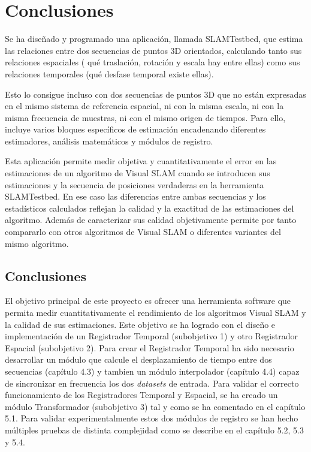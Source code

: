 \newpage

\chapter{Conclusiones} \label{cap:conclusiones}

Se ha diseñado y programado una aplicación, llamada SLAMTestbed, que estima las relaciones entre dos secuencias de puntos 3D orientados, calculando tanto sus relaciones espaciales ( qué traslación, rotación y escala hay entre ellas) como sus relaciones temporales (qué desfase temporal existe ellas).

Esto lo consigue incluso con dos secuencias de puntos 3D que no están expresadas en el mismo sistema de referencia espacial, ni con la misma escala, ni con la misma frecuencia de muestras, ni con el mismo origen de tiempos. Para ello, incluye varios bloques específicos de estimación encadenando diferentes estimadores, análisis matemáticos y módulos de registro.

Esta aplicación permite medir objetiva y cuantitativamente el error en las estimaciones de un algoritmo de Visual SLAM cuando se introducen sus estimaciones y la secuencia de posiciones verdaderas en la herramienta SLAMTestbed. En ese caso las diferencias entre ambas secuencias y los estadísticos calculados reflejan la calidad y la exactitud de las estimaciones del algoritmo.
Además de caracterizar sus calidad objetivamente permite por tanto compararlo con otros algoritmos de Visual SLAM o diferentes variantes del mismo algoritmo.


\section{Conclusiones}

El objetivo principal de este proyecto es ofrecer una herramienta software que permita medir cuantitativamente el rendimiento de los algoritmos Visual SLAM y la calidad de sus estimaciones.
Este objetivo se ha logrado con el diseño e implementación de un Registrador Temporal (subobjetivo 1) y otro Registrador Espacial (subobjetivo 2). 
Para crear el Registrador Temporal ha sido necesario desarrollar un módulo que calcule el desplazamiento de tiempo entre dos secuencias (capítulo 4.3) y tambien un módulo interpolador (capítulo 4.4) capaz de sincronizar en frecuencia los dos \textit{datasets} de entrada. Para validar el correcto funcionamiento de los Registradores Temporal y Espacial, se ha creado un módulo Transformador (subobjetivo 3) tal y como se ha comentado en el capítulo 5.1.
Para validar experimentalmente estos dos módulos de registro se han hecho múltiples pruebas de distinta complejidad como se describe en el capítulo 5.2, 5.3 y 5.4.

